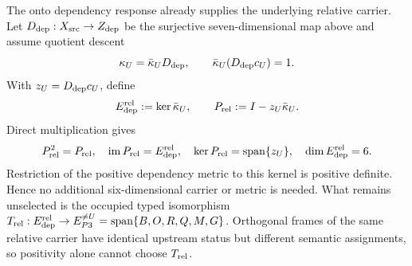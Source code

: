 The onto dependency response already supplies the underlying relative
carrier.  Let
$D_{\rm dep}:X_{\rm src}\to Z_{\rm dep}$ be the surjective seven-dimensional
map above and assume quotient descent
\begin{equation}
 \kappa_U=\bar\kappa_UD_{\rm dep},\qquad
 \bar\kappa_U(D_{\rm dep}c_U)=1.
 \label{eq:p3relsplit}
\end{equation}
With $z_U=D_{\rm dep}c_U$, define
\begin{equation}
 E_{\rm dep}^{\rm rel}:=\ker\bar\kappa_U,\qquad
 P_{\rm rel}:=I-z_U\bar\kappa_U.
 \label{eq:p3relprojector}
\end{equation}
Direct multiplication gives
\begin{equation}
 P_{\rm rel}^2=P_{\rm rel},\quad
 \operatorname{im}P_{\rm rel}=E_{\rm dep}^{\rm rel},\quad
 \ker P_{\rm rel}=\operatorname{span}\{z_U\},\quad
 \dim E_{\rm dep}^{\rm rel}=6.
 \label{eq:p3relcarrier}
\end{equation}
Restriction of the positive dependency metric to this kernel is positive
definite.  Hence no additional six-dimensional carrier or metric is needed.
What remains unselected is the occupied typed isomorphism
$T_{\rm rel}:E_{\rm dep}^{\rm rel}\to
E_{P3}^{\ne U}=\operatorname{span}\{B,O,R,Q,M,G\}$.
Orthogonal frames of the same relative carrier have identical upstream
status but different semantic assignments, so positivity alone cannot choose
$T_{\rm rel}$.

